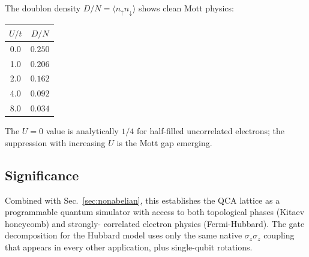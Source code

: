 The doublon density $D/N = \langle n_\uparrow n_\downarrow\rangle$
shows clean Mott physics:
\begin{center}
\begin{tabular}{cc}
\hline
$U/t$ & $D/N$ \\
\hline
0.0 & $0.250$ \\
1.0 & $0.206$ \\
2.0 & $0.162$ \\
4.0 & $0.092$ \\
8.0 & $0.034$ \\
\hline
\end{tabular}
\end{center}
The $U = 0$ value is analytically $1/4$ for half-filled
uncorrelated electrons; the suppression with increasing $U$ is
the Mott gap emerging.

\subsection{Significance}

Combined with Sec.~\ref{sec:nonabelian}, this establishes the
QCA lattice as a programmable quantum simulator with access to
both topological phases (Kitaev honeycomb) and strongly-
correlated electron physics (Fermi-Hubbard).  The gate
decomposition for the Hubbard model uses only the same native
$\sigma_z \sigma_z$ coupling that appears in every other
application, plus single-qubit rotations.
